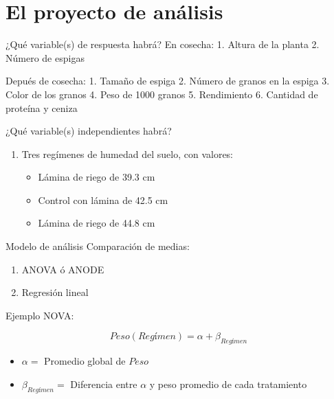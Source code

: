 \documentclass[
  11pt,
  ignorenonframetext,
]{beamer}
\providecommand{\tightlist}{%
  \setlength{\itemsep}{0pt}\setlength{\parskip}{0pt}}
\begin{document}
\hypertarget{el-proyecto-de-anuxe1lisis}{%
\section{El proyecto de análisis}\label{el-proyecto-de-anuxe1lisis}}

\begin{frame}{¿Qué variable(s) de respuesta habrá?}
\protect\hypertarget{quuxe9-variables-de-respuesta-habruxe1}{}
En cosecha: 1. Altura de la planta 2. Número de espigas

Depués de cosecha: 1. Tamaño de espiga 2. Número de granos en la espiga
3. Color de los granos 4. Peso de 1000 granos 5. Rendimiento 6. Cantidad
de proteína y ceniza
\end{frame}

\begin{frame}{¿Qué variable(s) independientes habrá?}
\protect\hypertarget{quuxe9-variables-independientes-habruxe1}{}
\begin{enumerate}
\item
  Tres regímenes de humedad del suelo, con valores:

  \begin{itemize}
  \tightlist
  \item
    Lámina de riego de 39.3 cm
  \item
    Control con lámina de 42.5 cm
  \item
    Lámina de riego de 44.8 cm
  \end{itemize}
\end{enumerate}
\end{frame}

\begin{frame}{Modelo de análisis}
\protect\hypertarget{modelo-de-anuxe1lisis}{}
Comparación de medias:

\begin{enumerate}
\tightlist
\item
  ANOVA ó ANODE
\item
  Regresión lineal
\end{enumerate}

Ejemplo NOVA:

\[ Peso(Regímen) =  \alpha + \beta_{Regímen} \]

\begin{itemize}
\tightlist
\item
  \(\alpha =\) Promedio global de \(Peso\)
\item
  \(\beta_{Regímen} =\) Diferencia entre \(\alpha\) y peso promedio de
  cada tratamiento
\end{itemize}
\end{frame}
\end{document}
